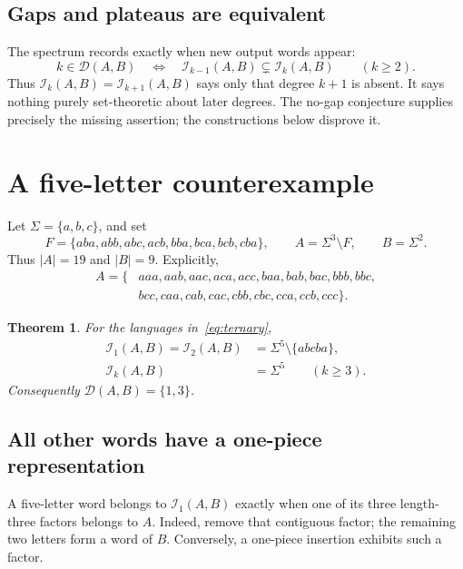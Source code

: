 \documentclass[11pt,letterpaper]{article}
\newtheorem{theorem}{Theorem}[section]
\theoremstyle{definition}\newtheorem{definition}[theorem]{Definition}
\theoremstyle{remark}\newtheorem{remark}[theorem]{Remark}
\theoremstyle{definition}\newtheorem{question}[theorem]{Question}
\newcommand{\ins}[3]{\mathcal I_{#1}(#2,#3)}
\newcommand{\spec}[2]{\mathcal D(#1,#2)}
\begin{document}
\subsection{Gaps and plateaus are equivalent}

The spectrum records exactly when new output words appear:
\begin{equation}
 k\in\spec{A}{B}\quad\Longleftrightarrow\quad
 \ins{k-1}{A}{B}\subsetneq\ins{k}{A}{B}\qquad(k\geq2).
 \label{eq:new-degree}
\end{equation}
Thus $\ins{k}{A}{B}=\ins{k+1}{A}{B}$ says only that degree $k+1$ is absent. It says nothing purely set-theoretic about later degrees. The no-gap conjecture supplies precisely the missing assertion; the constructions below disprove it.

\section{A five-letter counterexample}\label{sec:ternary}

Let $\Sigma=\{a,b,c\}$, and set
\begin{equation}
 F=\{aba,abb,abc,acb,bba,bca,bcb,cba\},\qquad
 A=\Sigma^3\setminus F,\qquad B=\Sigma^2.
 \label{eq:ternary}
\end{equation}
Thus $|A|=19$ and $|B|=9$. Explicitly,
\begin{align*}
 A=\{&aaa,aab,aac,aca,acc,baa,bab,bac,bbb,bbc,\\
     &bcc,caa,cab,cac,cbb,cbc,cca,ccb,ccc\}.
\end{align*}

\begin{theorem}\label{thm:ternary}
For the languages in~\eqref{eq:ternary},
\begin{align*}
 \ins{1}{A}{B}=\ins{2}{A}{B}&=\Sigma^5\setminus\{abcba\},\\
 \ins{k}{A}{B}&=\Sigma^5\qquad(k\geq3).
\end{align*}
Consequently $\spec{A}{B}=\{1,3\}$.
\end{theorem}

\subsection{All other words have a one-piece representation}

A five-letter word belongs to $\ins{1}{A}{B}$ exactly when one of its three length-three factors belongs to $A$. Indeed, remove that contiguous factor; the remaining two letters form a word of $B$. Conversely, a one-piece insertion exhibits such a factor.
\end{document}
